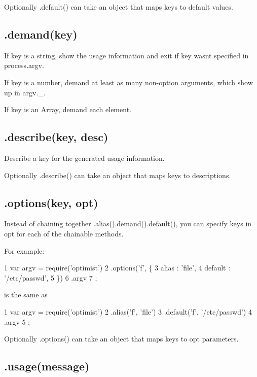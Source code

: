 Optionally {\ttfamily .default()} can take an object that maps keys to default values.

\subsection*{.demand(key) }

If {\ttfamily key} is a string, show the usage information and exit if {\ttfamily key} wasn\textquotesingle{}t specified in {\ttfamily process.\+argv}.

If {\ttfamily key} is a number, demand at least as many non-\/option arguments, which show up in {\ttfamily argv.\+\_\+}.

If {\ttfamily key} is an Array, demand each element.

\subsection*{.describe(key, desc) }

Describe a {\ttfamily key} for the generated usage information.

Optionally {\ttfamily .describe()} can take an object that maps keys to descriptions.

\subsection*{.options(key, opt) }

Instead of chaining together {\ttfamily .alias().demand().default()}, you can specify keys in {\ttfamily opt} for each of the chainable methods.

For example\+:


\begin{DoxyCode}
1 var argv = require('optimist')
2     .options('f', \{
3         alias : 'file',
4         default : '/etc/passwd',
5     \})
6     .argv
7 ;
\end{DoxyCode}


is the same as


\begin{DoxyCode}
1 var argv = require('optimist')
2     .alias('f', 'file')
3     .default('f', '/etc/passwd')
4     .argv
5 ;
\end{DoxyCode}


Optionally {\ttfamily .options()} can take an object that maps keys to {\ttfamily opt} parameters.

\subsection*{.usage(message) }

